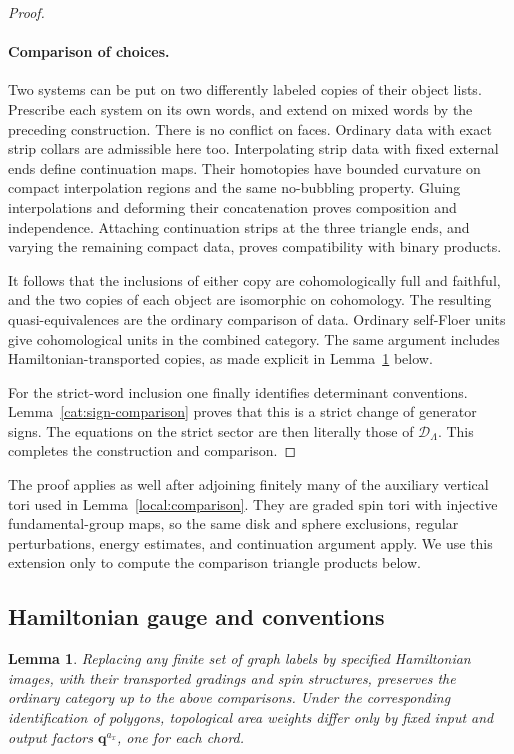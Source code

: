 \documentclass[11pt]{article}
\newtheorem{lemma}[theorem]{Lemma}
\theoremstyle{definition}
\theoremstyle{remark}
\newcommand{\qnov}{\mathbf q}
\numberwithin{equation}{section}
\begin{document}
\begin{proof}
\paragraph{Comparison of choices.}
Two systems can be put on two differently labeled copies of their
object lists.  Prescribe each system on its own words, and extend on
mixed words by the preceding construction.  There is no conflict on
faces.  Ordinary data with exact strip collars are admissible here too.
Interpolating strip data with fixed external ends define continuation
maps.  Their homotopies have bounded curvature on compact interpolation
regions and the same no-bubbling property.  Gluing interpolations and
deforming their concatenation proves composition and independence.
Attaching continuation strips at the three triangle ends, and varying
the remaining compact data, proves compatibility with binary products.

It follows that the inclusions of either copy are cohomologically full
and faithful, and the two copies of each object are isomorphic on
cohomology.  The resulting quasi-equivalences are the ordinary
comparison of data.  Ordinary self-Floer units give cohomological
units in the combined category.  The same argument includes
Hamiltonian-transported copies, as made explicit in
Lemma~\ref{cat:gauge} below.

For the strict-word inclusion one finally identifies determinant
conventions.  Lemma~\ref{cat:sign-comparison} proves that this is a
strict change of generator signs.  The equations on the strict
sector are then literally those of \(\mathcal D_\Lambda\).
This completes the construction and comparison.
\end{proof}

The proof applies as well after adjoining finitely many of the auxiliary
vertical tori used in Lemma~\ref{local:comparison}.  They are graded spin
tori with injective fundamental-group maps, so the same disk and sphere
exclusions, regular perturbations, energy estimates, and continuation
argument apply.  We use this extension only to compute the comparison
triangle products below.

\subsection{Hamiltonian gauge and conventions}

\begin{lemma}\label{cat:gauge}
Replacing any finite set of graph labels by specified Hamiltonian
images, with their transported gradings and spin structures, preserves
the ordinary category up to the above comparisons.  Under the
corresponding identification of polygons, topological area weights
differ only by fixed input and output factors
\(\qnov^{a_x}\), one for each chord.
\end{lemma}
\end{document}
